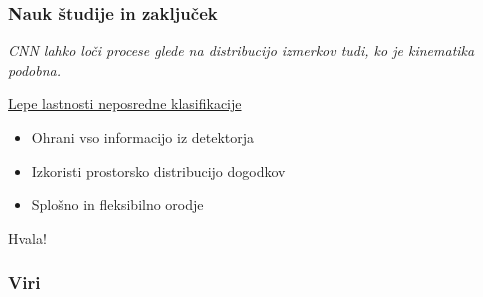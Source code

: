 \documentclass[14pt, t]{beamer}
\begin{document}
\begin{frame}
    \frametitle{Nauk študije in zaključek}

    \begin{center}
        \textit{CNN lahko loči procese glede na distribucijo izmerkov tudi, ko je kinematika podobna.}
    \end{center}
    \underline{Lepe lastnosti neposredne klasifikacije}
    \vspace{1mm}
    \begin{itemize}
    
        \item Ohrani vso informacijo iz detektorja
        \vspace{0.5mm}

        \item Izkoristi prostorsko distribucijo dogodkov
        \vspace{0.5mm}

        \item Splošno in fleksibilno orodje
    
    \end{itemize}

    \pause
    \begin{center}
        \Large{Hvala!}
    \end{center}
    
\end{frame}

\begin{frame}[allowframebreaks]
    \frametitle{Viri}
    \printbibliography
\end{frame}
\end{document}
